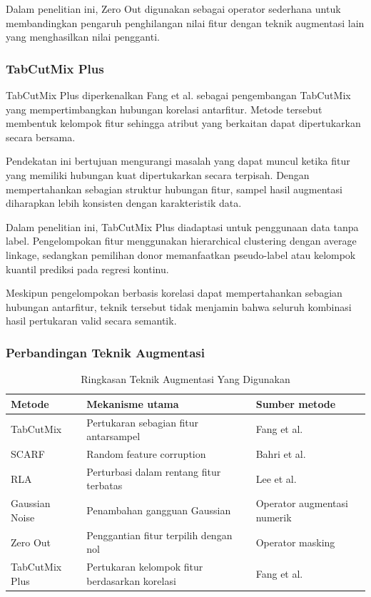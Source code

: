 Dalam penelitian ini, Zero Out digunakan sebagai operator sederhana untuk membandingkan pengaruh penghilangan nilai fitur dengan teknik augmentasi lain yang menghasilkan nilai pengganti.

\subsubsection{TabCutMix Plus}

TabCutMix Plus diperkenalkan Fang et al. \cite{ref12} sebagai pengembangan TabCutMix yang mempertimbangkan hubungan korelasi antarfitur. Metode tersebut membentuk kelompok fitur sehingga atribut yang berkaitan dapat dipertukarkan secara bersama.

Pendekatan ini bertujuan mengurangi masalah yang dapat muncul ketika fitur yang memiliki hubungan kuat dipertukarkan secara terpisah. Dengan mempertahankan sebagian struktur hubungan fitur, sampel hasil augmentasi diharapkan lebih konsisten dengan karakteristik data.

Dalam penelitian ini, TabCutMix Plus diadaptasi untuk penggunaan data tanpa label. Pengelompokan fitur menggunakan hierarchical clustering dengan average linkage, sedangkan pemilihan donor memanfaatkan pseudo-label atau kelompok kuantil prediksi pada regresi kontinu.

Meskipun pengelompokan berbasis korelasi dapat mempertahankan sebagian hubungan antarfitur, teknik tersebut tidak menjamin bahwa seluruh kombinasi hasil pertukaran valid secara semantik.

\subsubsection{Perbandingan Teknik Augmentasi}

\begin{table}[!t]
\caption{Ringkasan Teknik Augmentasi Yang Digunakan}
\label{tab:iii}
\centering
\footnotesize
\renewcommand{\arraystretch}{1.15}
\begin{tabularx}{\textwidth}{XXX}
\hline
\textbf{Metode} & \textbf{Mekanisme utama} & \textbf{Sumber metode} \\
\hline
TabCutMix & Pertukaran sebagian fitur antarsampel & Fang et al. \cite{ref12} \\
SCARF & Random feature corruption & Bahri et al. \cite{ref7} \\
RLA & Perturbasi dalam rentang fitur terbatas & Lee et al. \cite{ref13} \\
Gaussian Noise & Penambahan gangguan Gaussian & Operator augmentasi numerik \\
Zero Out & Penggantian fitur terpilih dengan nol & Operator masking \\
TabCutMix Plus & Pertukaran kelompok fitur berdasarkan korelasi & Fang et al. \cite{ref12} \\
\hline
\end{tabularx}
\end{table}


